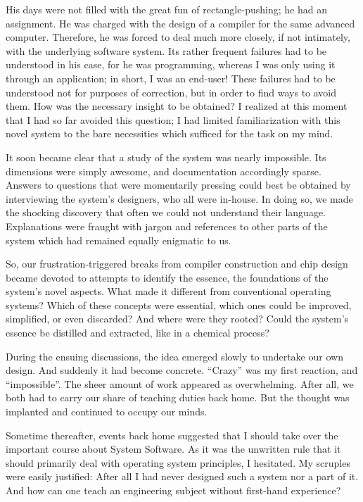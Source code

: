His days were not filled with the great fun of rectangle-pushing; he
had an assignment. He was charged with the design of a compiler for
the same advanced computer. Therefore, he was forced to deal much more
closely, if not intimately, with the underlying software system. Its
rather frequent failures had to be understood in his case, for he was
programming, whereas I was only using it through an application; in
short, I was an end-user! These failures had to be understood not for
purposes of correction, but in order to find ways to avoid them. How
was the necessary insight to be obtained? I realized at this moment
that I had so far avoided this question; I had limited familiarization
with this novel system to the bare necessities which sufficed for the
task on my mind.

It soon became clear that a study of the system was nearly
impossible. Its dimensions were simply awesome, and documentation
accordingly sparse. Answers to questions that were momentarily
pressing could best be obtained by interviewing the system's
designers, who all were in-house. In doing so, we made the shocking
discovery that often we could not understand their
language. Explanations were fraught with jargon and references to
other parts of the system which had remained equally enigmatic to us.

So, our frustration-triggered breaks from compiler construction and
chip design became devoted to attempts to identify the essence, the
foundations of the system's novel aspects. What made it different from
conventional operating systems? Which of these concepts were
essential, which ones could be improved, simplified, or even
discarded? And where were they rooted? Could the system's essence be
distilled and extracted, like in a chemical process?

During the ensuing discussions, the idea emerged slowly to undertake
our own design. And suddenly it had become concrete. ``Crazy'' was my
first reaction, and ``impossible''. The sheer amount of work appeared as
overwhelming. After all, we both had to carry our share of teaching
duties back home. But the thought was implanted and continued to
occupy our minds.

Sometime thereafter, events back home suggested that I should take
over the important course about System Software. As it was the
unwritten rule that it should primarily deal with operating system
principles, I hesitated. My scruples were easily justified: After all
I had never designed such a system nor a part of it. And how can one
teach an engineering subject without first-hand experience?

